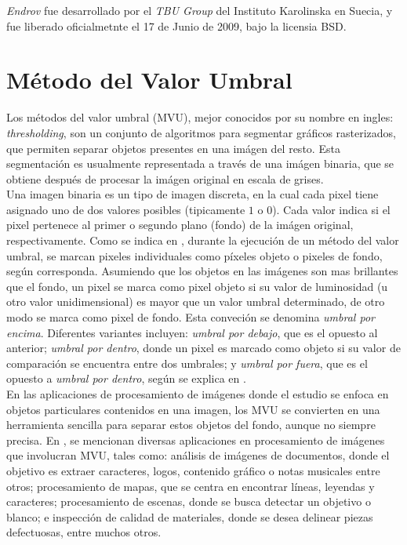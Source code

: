 \emph{Endrov} fue desarrollado por el \emph{TBU Group} del Instituto Karolinska en Suecia, y 
fue liberado oficialmetnte el 17 de Junio de 2009, bajo la licensia BSD.


\section{M\'etodo del Valor Umbral}
\label{sec:thresholding}

Los m\'etodos del valor umbral (MVU), mejor conocidos por su nombre en ingles: \emph{thresholding},
son un conjunto de algoritmos para segmentar gr\'aficos rasterizados, que permiten separar
objetos presentes en una im\'agen del resto. Esta segmentaci\'on es usualmente representada
a trav\'es de una im\'agen binaria, que se obtiene despu\'es de procesar la im\'agen original 
en escala de grises.\\

Una imagen binaria es un tipo de imagen discreta, en la cual cada pixel tiene asignado uno de
dos valores posibles (tipicamente $1$ o $0$). Cada valor indica si el pixel
pertenece al primer o segundo plano (fondo) de la im\'agen original, respectivamente.
Como se indica en \cite{web:thresholding}, durante la ejecuci\'on de un m\'etodo del valor
umbral, se marcan pixeles individuales como p\'ixeles objeto o pixeles de fondo, seg\'un
corresponda. Asumiendo que los objetos en las im\'agenes son mas brillantes que el fondo,
un pixel se marca como pixel objeto si su valor de luminosidad (u otro valor unidimensional) 
es mayor que un valor umbral determinado, de otro modo se marca como pixel de fondo.
Esta conveci\'on se denomina \emph{umbral por encima}. Diferentes variantes incluyen:
\emph{umbral por debajo}, que es el opuesto al anterior; \emph{umbral por dentro}, donde un
pixel es marcado como objeto si su valor de comparaci\'on se encuentra entre dos 
umbrales; y \emph{umbral por fuera}, que es el opuesto a \emph{umbral por dentro}, seg\'un
se explica en \cite{shapiro}.\\


En las aplicaciones de procesamiento de im\'agenes donde el estudio se enfoca en 
objetos particulares contenidos en una imagen, los MVU se convierten en una herramienta
sencilla para separar estos objetos del fondo, aunque no siempre precisa. En \cite[p.146]{thres},
se mencionan diversas aplicaciones en procesamiento de im\'agenes que involucran MVU, tales
como: an\'alisis de im\'agenes de documentos, donde el objetivo es extraer caracteres, logos,
contenido gr\'afico o notas musicales entre otros; procesamiento de mapas, que se centra en
encontrar l\'ineas, leyendas y caracteres; procesamiento de escenas, donde se busca detectar
un objetivo o blanco; e inspecci\'on de calidad de materiales, donde se desea delinear piezas
defectuosas, entre muchos otros.\\

